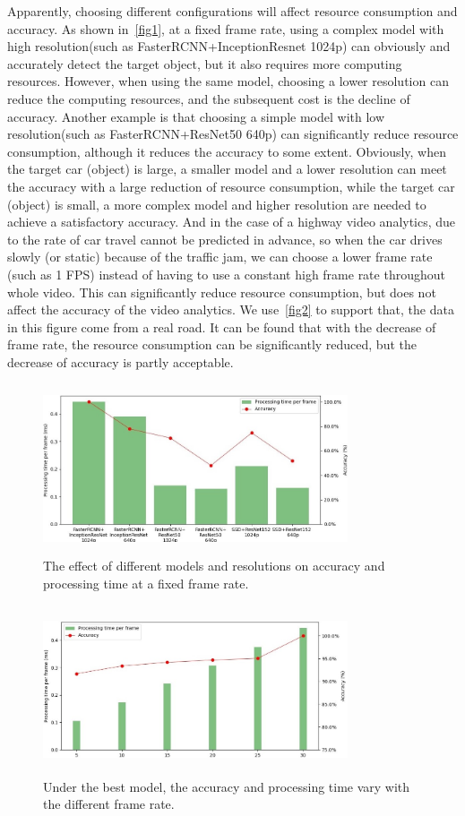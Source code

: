 Apparently, choosing different configurations will affect resource consumption and accuracy. As shown in~\autoref{fig1}, at a fixed frame rate, using a complex model with high resolution(such as FasterRCNN+InceptionResnet 1024p) can obviously and accurately detect the target object, but it also requires more computing resources. However, when using the same model, choosing a lower resolution can reduce the computing resources, and the subsequent cost is the decline of accuracy. Another example is that choosing a simple model with low resolution(such as FasterRCNN+ResNet50 640p) can significantly reduce resource consumption, although it reduces the accuracy to some extent. Obviously, when the target car (object) is large, a smaller model and a lower resolution can meet the accuracy with a large reduction of resource consumption, while the target car (object) is small, a more complex model and higher resolution are needed to achieve a satisfactory accuracy. And in the case of a highway video analytics, due to the rate of car travel cannot be predicted in advance, so when the car drives slowly (or static) because of the traffic jam, we can choose a lower frame rate (such as 1 FPS) instead of having to use a constant high frame rate throughout whole video. This can significantly reduce resource consumption, but does not affect the accuracy of the video analytics. We use~\autoref{fig2} to support that, the data in this figure come from a real road. It can be found that with the decrease of frame rate, the resource consumption can be significantly reduced, but the decrease of accuracy is partly acceptable.

\begin{figure}[h]
\includegraphics[width=9cm,height=5cm]{figures/figure1.jpg}
\centering
\caption{The effect of different models and resolutions on accuracy and processing time at a fixed frame rate.}
\label{fig1}
\end{figure}

\begin{figure}[h]
\includegraphics[width=9cm,height=5cm]{figures/figure2.jpg}
\centering
\caption{Under the best model, the accuracy and processing time vary with the different frame rate.}
\label{fig2}
\end{figure}

